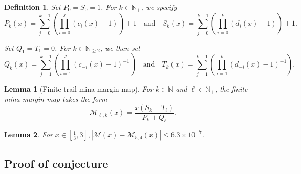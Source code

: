 \documentclass{article}
\newtheorem{definition}{Definition}
\newtheorem{lemma}{Lemma}
\newcommand*{\N}{\mathbb{N}}
\newcommand*{\M}{\mathcal{M}}
\begin{document}
\begin{definition}
    Set $P_0=S_0=1$. For $k\in\N_+$, we specify 
    $$P_{k}(x)=\sum_{j=0}^{k-1}\left(\prod_{i=0}^{j}(c_i(x)-1)\right) + 1 \quad \text{and} \quad
    S_{k}(x) = \sum_{j=0}^{k-1}\left(\prod_{i=0}^{k}(d_i(x)-1)\right) + 1.$$

    Set $Q_1=T_1=0$. For $k\in\N_{\geq2}$, we then set 
    $$Q_{k}(x)=\sum_{j=1}^{k-1}\left(\prod_{i=1}^{j}(c_{-i}(x)-1)^{-1}\right) \quad \text{and} \quad
    T_{k}(x) = \sum_{j=1}^{k-1}\left(\prod_{i=1}^{k}(d_{-i}(x)-1)^{-1}\right).$$
\end{definition}

\begin{lemma}[Finite-trail mina margin map]
    For $k\in\N$ and $\ell\in\N_+$, the finite mina margin map takes the form 
    $$\M_{\ell, k}(x)=\frac{x(S_k+T_\ell)}{P_k+Q_\ell}.$$
\end{lemma}

\begin{lemma}
    For $x\in[\frac{1}{3}, 3], |\M(x)-\M_{5,4}(x)| \leq 6.3\times 10^{-7}$.
\end{lemma}

\subsection{\centering Proof of conjecture}
\end{document}
